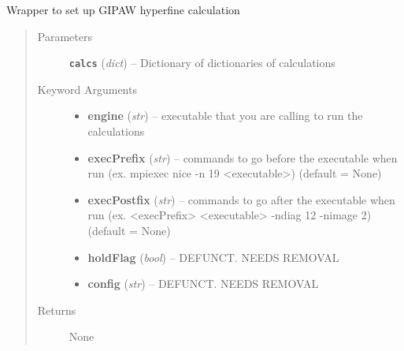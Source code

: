 \documentclass[letterpaper,10pt,english]{sphinxmanual}
\begin{document}
\begin{fulllineitems}
\label{run:run.hyperfine}
Wrapper to set up GIPAW hyperfine calculation
\begin{quote}\begin{description}
\item[{Parameters}] \leavevmode
\textbf{\texttt{calcs}} (\emph{dict}) -- Dictionary of dictionaries of calculations

\item[{Keyword Arguments}] \leavevmode\begin{itemize}
\item {} 
\textbf{engine} (\emph{str}) --
executable that you are calling to run the calculations

\item {} 
\textbf{execPrefix} (\emph{str}) --
commands to go before the executable when run
(ex. mpiexec nice -n 19 \textless{}executable\textgreater{}) (default = None)

\item {} 
\textbf{execPostfix} (\emph{str}) --
commands to go after the executable when run
(ex. \textless{}execPrefix\textgreater{} \textless{}executable\textgreater{} -ndiag 12 -nimage 2) (default = None)

\item {} 
\textbf{holdFlag} (\emph{bool}) --
DEFUNCT. NEEDS REMOVAL

\item {} 
\textbf{config} (\emph{str}) --
DEFUNCT. NEEDS REMOVAL

\end{itemize}

\item[{Returns}] \leavevmode
None

\end{description}\end{quote}

\end{fulllineitems}

\end{document}
